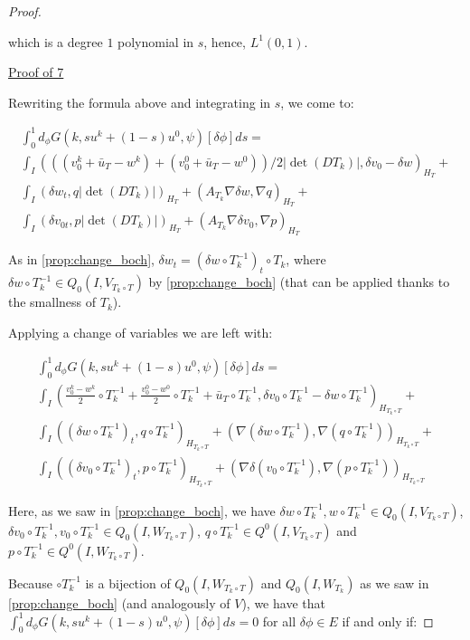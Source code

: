 \documentclass[english,a4paper,10pt,oneside]{scrbook}	%
\theoremstyle{break}
\newenvironment{mproof}[1][\proofname]{%
  \begin{proof}[#1]$ $\par\nobreak\ignorespaces
}{%
  \end{proof}
}
\renewcommand*{\proofname}{Proof}
\theoremstyle{remark}
\begin{document}
\begin{mproof}
which is a degree $1$ polynomial in $s$, hence, $L^1(0,1)$.

\underline{Proof of 7}

Rewriting the formula above and integrating in $s$, we come to:

\begin{align*}
\int_0^1d_\phi G(k, su^k + (1-s)u^0,\psi)[\delta \phi]ds = \\
\int_I (((v_0^k+\bar{u}_T - w^k)+(v_0^0+\bar{u}_T - w^0))/2|\det(DT_k)|,\delta v_0-\delta w)_{H_T}+\\
\int_I ( \delta w_t , q |\det(DT_k)|)_{H_T}+ (A_{T_k}\nabla \delta w, \nabla q)_{H_T}+\\
\int_I ( \delta v_{0t},p |\det(DT_k)|)_{H_T} + (A_{T_k} \nabla \delta v_0, \nabla p)_{H_T}
\end{align*}

As in \cref{prop:change_boch}, $ \delta w_t  = (\delta w\circ T_k^{-1})_t\circ T_k$, where $\delta w\circ T_k^{-1} \in Q_0(I,V_{T_k \circ T})$ by \cref{prop:change_boch} (that can be applied thanks to the smallness of $T_k$).

Applying a change of variables we are left with:

\begin{align*}
\int_0^1 d_\phi G(k, su^k + (1-s)u^0,\psi)[\delta \phi]ds = \\
\int_I \left (\frac{v_0^k-w^k}{2}\circ T_k^{-1}+ \frac{v_0^0-w^0}{2}\circ T_k^{-1}+\bar{u}_T\circ T_k^{-1} ,\delta v_0\circ T_k^{-1}-\delta w\circ T_k^{-1}\right)_{H_{T_k \circ T}}+\\
\int_I ((\delta w\circ T_k^{-1})_t , q\circ T_k^{-1} )_{H_{T_k \circ T}}+ (\nabla (\delta w\circ T_k^{-1}), \nabla( q\circ T_k^{-1}))_{H_{T_k \circ T}}+\\
\int_I ( (\delta v_{0}\circ T_k^{-1})_t,p \circ T_k^{-1})_{H_{T_k \circ T}} + ( \nabla \delta (v_0\circ T_k^{-1}), \nabla (p\circ T_k^{-1}))_{H_{T_k \circ T}}
\end{align*}

Here, as we saw in \cref{prop:change_boch}, we have $\delta w\circ T_k^{-1}, w\circ T_k^{-1} \in Q_0(I, V_{T_k \circ T})$, $ \delta v_{0}\circ T_k^{-1}, v_{0}\circ T_k^{-1} \in Q_0(I,W_{T_k \circ T})$, $q\circ T_k^{-1}\in Q^0(I, V_{T_k \circ T})$ and $p\circ T_k^{-1}\in Q^0(I, W_{T_k \circ T})$.

Because $\circ T_k^{-1}$ is a bijection of $Q_0(I,W_{T_k \circ T})$ and $Q_0(I,W_{T_k})$ as we saw in \ref{prop:change_boch} (and analogously of $V$), we have that  $\int_0^1 d_\phi G(k, su^k + (1-s)u^0,\psi)[\delta \phi]ds=0$ for all $\delta \phi \in E$ if and only if:


\end{mproof}
\end{document}
